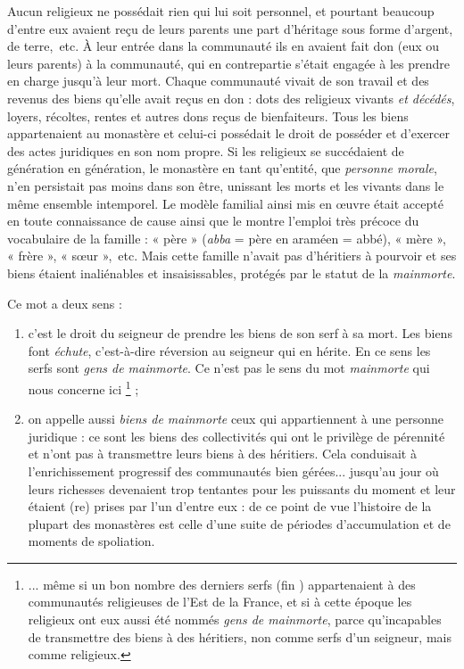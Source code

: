  Aucun religieux ne possédait rien qui lui soit personnel, et pourtant beaucoup d'entre eux avaient reçu de leurs parents une part d'héritage sous forme d'argent, de terre,~etc. À leur entrée dans la communauté ils en avaient fait don (eux ou leurs parents) à la communauté, qui en contrepartie s'était engagée à les prendre en charge jusqu'à leur mort. Chaque communauté vivait de son travail et des revenus des biens qu'elle avait reçus en don : dots des religieux vivants \emph{et décédés}, loyers, récoltes, rentes et autres dons reçus de bienfaiteurs. Tous les biens appartenaient au monastère et celui-ci possédait le droit de posséder et d'exercer des actes juridiques en son nom propre. Si les religieux se succédaient de génération en génération, le monastère en tant qu'entité, que \emph{personne morale}, n'en persistait pas moins dans son être, unissant les morts et les vivants dans le même ensemble intemporel. Le modèle familial ainsi mis en œuvre était accepté en toute connaissance de cause ainsi que le montre l'emploi très précoce du vocabulaire de la famille : « père » (\emph{abba} = père en araméen = abbé), « mère », « frère », « sœur »,~etc. Mais cette famille n'avait pas d'héritiers à pourvoir et ses biens étaient inaliénables et insaisissables, protégés par le statut de la \emph{mainmorte}. 
 
 Ce mot a deux sens :
\begin{enumerate}
\item c'est le droit du seigneur de prendre les biens de son serf à sa mort. Les biens font \emph{échute}, c'est-à-dire réversion au seigneur qui en hérite. En ce sens les serfs sont \emph{gens de mainmorte}. Ce n'est pas le sens du mot \emph{mainmorte} qui nous concerne ici%
\footnote{... même si un bon nombre des derniers serfs (fin ) appartenaient à des communautés religieuses de l'Est de la France, et si à cette époque les religieux ont eux aussi été nommés \emph{gens de mainmorte}, parce qu'incapables de transmettre des biens à des héritiers, non comme serfs d'un seigneur, mais comme religieux.}
 ;
\item on appelle aussi \emph{biens de mainmorte} ceux qui appartiennent à une personne juridique : ce sont les biens des collectivités qui ont le privilège de pérennité et n'ont pas à transmettre leurs biens à des héritiers. Cela conduisait à l'enrichissement progressif des communautés bien gérées... jusqu'au jour où leurs richesses devenaient trop tentantes pour les puissants du moment et leur étaient (re) prises par l'un d'entre eux : de ce point de vue l'histoire de la plupart des monastères est celle d'une suite de périodes d'accumulation et de moments de spoliation.
\end{enumerate} 


